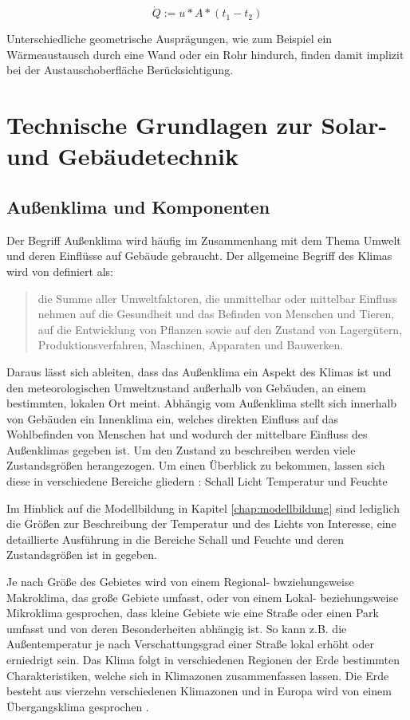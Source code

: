 \begin{equation}
\label{eq:qdot}
\dot{Q} := u*A*(t_{1}-t_{2})
\end{equation}

Unterschiedliche geometrische Ausprägungen, wie zum Beispiel ein Wärmeaustausch durch eine Wand oder ein Rohr hindurch, finden damit implizit bei der Austauschoberfläche Berücksichtigung.

\section{Technische Grundlagen zur Solar- und Gebäudetechnik}

\subsection{Außenklima und Komponenten}

Der Begriff Außenklima wird häufig im Zusammenhang mit dem Thema Umwelt und deren Einflüsse auf Gebäude gebraucht.  Der allgemeine Begriff des Klimas wird von \cite[S.~295]{ha13} definiert als:
\begin{quote}
\Gun die Summe aller Umweltfaktoren, die unmittelbar oder mittelbar Einfluss nehmen auf die Gesundheit und das Befinden von Menschen und Tieren, auf die Entwicklung von Pflanzen sowie auf den Zustand von Lagergütern, Produktionsverfahren, Maschinen, Apparaten und Bauwerken.\Gob
\end{quote}

Daraus lässt sich ableiten, dass das Außenklima ein Aspekt des Klimas ist und den meteorologischen Umweltzustand außerhalb von Gebäuden, an einem bestimmten, lokalen Ort meint. Abhängig vom Außenklima stellt sich innerhalb von Gebäuden ein Innenklima ein, welches direkten Einfluss auf das Wohlbefinden von Menschen hat und wodurch der mittelbare Einfluss des Außenklimas gegeben ist. Um den Zustand zu beschreiben werden viele Zustandsgrößen herangezogen. Um einen Überblick zu bekommen, lassen sich diese in verschiedene Bereiche gliedern \cite[S.~295f.]{ha13} :
Schall
Licht
Temperatur
und Feuchte
 
Im Hinblick auf die Modellbildung in Kapitel \ref{chap:modellbildung} sind lediglich die Größen zur Beschreibung der Temperatur und des Lichts von Interesse, eine detaillierte Ausführung in die Bereiche Schall und Feuchte und deren Zustandsgrößen ist in \cite{ha13} gegeben.

Je nach Größe des Gebietes wird von einem Regional- bwziehungsweise Makroklima, das große Gebiete umfasst, oder von einem Lokal- beziehungsweise Mikroklima gesprochen, dass kleine Gebiete wie eine Straße oder einen Park umfasst und von deren Besonderheiten abhängig ist. So kann z.B. die Außentemperatur je nach Verschattungsgrad einer Straße lokal erhöht oder erniedrigt sein.
Das Klima folgt in verschiedenen Regionen der Erde bestimmten Charakteristiken, welche sich in Klimazonen zusammenfassen lassen. Die Erde besteht aus vierzehn verschiedenen Klimazonen und in Europa wird von einem Übergangsklima gesprochen \cite[S.~296f.]{ha13}. 

